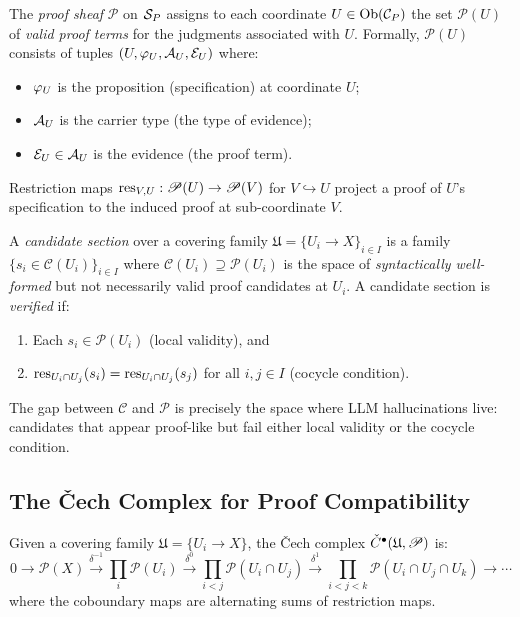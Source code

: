 \documentclass[11pt]{article}
\newcommand{\CandSpace}{\mathcal{C}}
\newcommand{\ProofSheaf}{\mathscr{P}}
\begin{document}
\begin{definition}\label{def:proof-sheaf}
The \emph{proof sheaf} $\ProofSheaf$ on $\mathcal{S}_P$ assigns to each
coordinate $U \in \mathrm{Ob}(\mathcal{C}_P)$ the set $\ProofSheaf(U)$ of
\emph{valid proof terms} for the judgments associated with $U$.
Formally, $\ProofSheaf(U)$ consists of tuples
$(U, \varphi_U, \mathcal{A}_U, \mathcal{E}_U)$ where:
\begin{itemize}
  \item $\varphi_U$ is the proposition (specification) at coordinate $U$;
  \item $\mathcal{A}_U$ is the carrier type (the type of evidence);
  \item $\mathcal{E}_U \in \mathcal{A}_U$ is the evidence (the proof term).
\end{itemize}
Restriction maps $\res_{V,U} : \ProofSheaf(U) \to \ProofSheaf(V)$
for $V \hookrightarrow U$ project a proof of $U$'s specification to
the induced proof at sub-coordinate $V$.
\end{definition}

\begin{definition}\label{def:candidate-section}
A \emph{candidate section} over a covering family
$\mathfrak{U} = \{U_i \to X\}_{i \in I}$ is a family
$\{s_i \in \CandSpace(U_i)\}_{i \in I}$ where
$\CandSpace(U_i) \supseteq \ProofSheaf(U_i)$ is the space of
\emph{syntactically well-formed} but not necessarily valid proof
candidates at $U_i$.  A candidate section is \emph{verified} if:
\begin{enumerate}[label=(\roman*)]
  \item Each $s_i \in \ProofSheaf(U_i)$ (local validity), and
  \item $\mathrm{res}_{U_i \cap U_j}(s_i) = \mathrm{res}_{U_i \cap U_j}(s_j)$ for
    all $i, j \in I$ (cocycle condition).
\end{enumerate}
\end{definition}

The gap between $\CandSpace$ and $\ProofSheaf$ is precisely the space
where LLM hallucinations live: candidates that appear proof-like but
fail either local validity or the cocycle condition.

\subsection{The \v{C}ech Complex for Proof Compatibility}\label{subsec:cech}

Given a covering family $\mathfrak{U} = \{U_i \to X\}$, the
\v{C}ech complex $\Cech^\bullet(\mathfrak{U}, \ProofSheaf)$ is:
\[
  0 \to \ProofSheaf(X) \xrightarrow{\delta^{-1}}
  \prod_{i} \ProofSheaf(U_i) \xrightarrow{\delta^0}
  \prod_{i < j} \ProofSheaf(U_i \cap U_j) \xrightarrow{\delta^1}
  \prod_{i < j < k} \ProofSheaf(U_i \cap U_j \cap U_k) \to \cdots
\]
where the coboundary maps are alternating sums of restriction maps.
\end{document}

